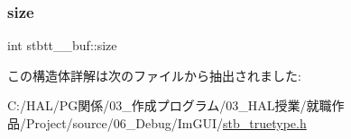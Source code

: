\subsubsection{\texorpdfstring{size}{size}}
{\footnotesize\ttfamily int stbtt\+\_\+\+\_\+buf\+::size}



この構造体詳解は次のファイルから抽出されました\+:\begin{DoxyCompactItemize}
\item 
C\+:/\+H\+A\+L/\+P\+G関係/03\+\_\+作成プログラム/03\+\_\+\+H\+A\+L授業/就職作品/\+Project/source/06\+\_\+\+Debug/\+Im\+G\+U\+I/\mbox{\hyperlink{stb__truetype_8h}{stb\+\_\+truetype.\+h}}\end{DoxyCompactItemize}
